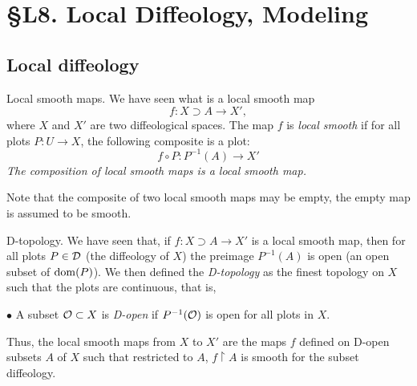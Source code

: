 
\chapter*{\S L8. Local Diffeology, Modeling}
\setcounter{footnote}{0}

\begin{abstract}
  In this lecture we shall see how local diffeology builds a new branch of diffeology with the modeling process.
\end{abstract}



\section{Local diffeology}

\begin{Article}{Local smooth maps.}{}
  We have seen what is a local smooth map
  $$%
    f \colon X \supset A \to X',
  $$%
  where $X$ and $X'$ are two diffeological spaces.
  The map $f$ is \emph{local smooth} if for all plots $P \colon U \to X$,
  the following composite is a plot:
  $$%
    f \circ P \colon P^{-1}(A) \to X'
  $$%
   {\itshape The composition of local smooth maps is a local smooth map.}

  Note that the composite of two local smooth maps may be empty,
  the empty map is assumed to be smooth.
\end{Article}


\begin{Article}{D-topology.}{}
  We have seen that,
  if $f \colon X \supset A \to X'$ is a local smooth map,
  then for all plots $P \in \mathcal{D}$ (the diffeology of $X$) the preimage $P^{-1}(A)$ is open (an open subset of $\mathrm{dom}(P)$).
  We then defined the \emph{D-topology} as the finest topology on $X$ such that the plots are continuous,
  that is,

  \hspace{1em} $\bullet$ A subset $\mathcal{O} \subset X$ is \emph{D-open} if $P^{-1}(\mathcal{O})$ is open for all plots in $X$.

  Thus,
  the local smooth maps from $X$ to $X'$ are the maps $f$ defined on D-open subsets $A$ of $X$ such that restricted to $A$,
  $f\restriction A$ is smooth for the subset diffeology.
\end{Article}

